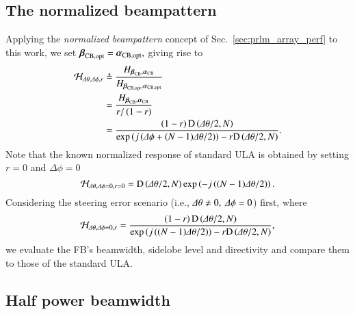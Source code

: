 \subsection{The normalized beampattern}
\label{subsection_spatialIIR_normBP}
Applying the \emph{normalized beampattern} concept of Sec.~\ref{sec:prlm_array_perf} to this work, we set $\boldsymbol{\beta}_{\text{CB},\text{opt}}=\boldsymbol{\alpha}_{\text{CB},\text{opt}},$ giving rise to
\begin{equation}
    \label{eq_narmalized_pattern}
    \begin{split}
        \mathcal{H}_{\Delta\theta,\Delta\phi,r}&\triangleq
        \frac{
        H_{\boldsymbol{\beta}_{\text{CB}},\boldsymbol{\alpha}_{\text{CB}}}
        }{
        H_{\boldsymbol{\beta}_{\text{CB},\text{opt}},\boldsymbol{\alpha}_{\text{CB},\text{opt}}}
        }\\
        &=
        \frac{
        H_{\boldsymbol{\beta}_{\text{CB}},\boldsymbol{\alpha}_{\text{CB}}}
        }{
        r/\left({1-r}\right)
        }\\
        &=
        \frac{\left({1-r}\right)\text{D}\left({\Delta\theta/2,N}\right)}{\exp\left({j\left({\Delta\phi+(N-1)\Delta\theta/2}\right)}\right)-r\text{D}\left({\Delta\theta/2,N}\right)}.
    \end{split}
\end{equation}
Note that the known \cite{van2004optimum} normalized response of standard ULA is obtained by setting $r=0$ and $\Delta\phi=0$
$$
\mathcal{H}_{\Delta\theta,\Delta\phi=0,r=0}=
             \text{D}\left({\Delta\theta/2,N}\right)\exp\left({-j\left({(N-1)\Delta\theta/2}\right)}\right).
$$
Considering the steering error scenario (i.e., $\Delta\theta\neq0,\ \Delta\phi=0$) first, where 
\begin{equation}\label{eq_Hdphi0}
\mathcal{H}_{\Delta\theta,\Delta\phi=0,r}=
             \frac{\left({1-r}\right)\text{D}\left({\Delta\theta/2,N}\right)}{\exp\left({j\left({(N-1)\Delta\theta/2}\right)}\right)-r\text{D}\left({\Delta\theta/2,N}\right)},
\end{equation}
we evaluate the FB's beamwidth, sidelobe level and directivity and compare them to those of the standard ULA.
\subsection{Half power beamwidth}

